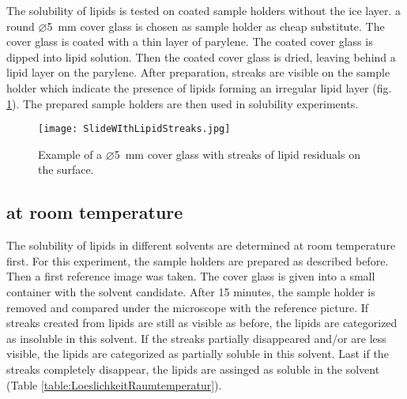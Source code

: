 The solubility of lipids is tested on coated sample holders without the ice layer. a round $\varnothing$\SI{5}{\milli\meter} cover glass is chosen as sample holder as cheap substitute. The cover glass is coated with a thin layer of parylene. The coated cover glass is dipped into lipid solution. Then the coated cover glass is dried, leaving behind a lipid layer on the parylene. After preparation, streaks are visible on the sample holder which indicate the presence of lipids forming an irregular lipid layer (fig. \ref{fig:streaksOnSampleHolder}). The prepared sample holders are then used in solubility experiments.

\begin{figure}[hbt!]
	\centering
	\texttt{[image: SlideWIthLipidStreaks.jpg]}
	\caption{Example of a $\varnothing$\SI{5}{\milli\meter} cover glass with streaks of lipid residuals on the surface.}
	\label{fig:streaksOnSampleHolder}
\end{figure}

\subsection{at room temperature}

The solubility of lipids in different solvents are determined at room temperature first. For this experiment, the sample holders are prepared as described before. Then a first reference image was taken. The cover glass is given into a small container with the solvent candidate. After 15 minutes, the sample holder is removed and compared under the microscope with the reference picture. If streaks created from lipids are still as visible as before, the lipids are categorized as insoluble in this solvent. If the streaks partially disappeared and/or are less visible, the lipids are categorized as partially soluble in this solvent. Last if the streaks completely disappear, the lipids are assinged as soluble in the solvent (Table \ref{table:LoeslichkeitRaumtemperatur}).


